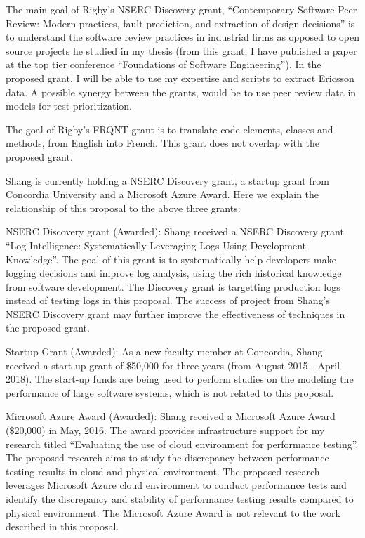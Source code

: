 \documentclass[12pt, letterpaper]{article}
\begin{document}
\fancyhead{}
\pagestyle{fancy}
\renewcommand{\headrulewidth}{0pt}

\begin{center}
\begin{LARGE}
\noindent
{}
\end{LARGE}
\end{center}


The main goal of Rigby's NSERC Discovery grant, “Contemporary Software Peer Review:
Modern practices, fault prediction, and extraction of design decisions” is to
understand the software review practices in industrial firms as opposed to open
source projects he studied in my thesis (from this grant, I have published a
paper at the top tier conference “Foundations of Software Engineering”). 
%
In the proposed grant, I will be able to use my expertise and scripts to
extract Ericsson data. A possible synergy between the grants, would be to use
peer review data in models for test prioritization. 

The goal of Rigby's FRQNT grant is to translate code elements, classes and methods,
from English into French. This grant does not overlap with the proposed grant.


Shang is currently holding a NSERC Discovery grant, a startup grant from Concordia University and a Microsoft Azure Award. Here we explain the relationship of this proposal to the above three grants:

NSERC Discovery grant (Awarded): Shang received a NSERC Discovery grant ``Log Intelligence: Systematically Leveraging Logs Using Development Knowledge''. The goal of this grant is to systematically help developers make logging decisions and improve log analysis, using the rich historical knowledge from software development. The Discovery grant is targetting production logs instead of testing logs in this proposal. The success of project from Shang's NSERC Discovery grant may further improve the effectiveness of techniques in the proposed grant.

Startup Grant (Awarded): As a new faculty member at Concordia, Shang received a start-up grant of \$50,000 for three years (from August 2015 - April 2018). The start-up funds are being used to perform studies on the modeling the performance of large software systems, which is not related to this proposal. 

Microsoft Azure Award (Awarded): Shang received a Microsoft Azure Award (\$20,000) in May, 2016. The award provides infrastructure support for my research titled ``Evaluating the use of cloud environment for performance testing''. The proposed research aims to study the discrepancy between performance testing results in cloud and physical environment. The proposed research leverages Microsoft Azure cloud environment to conduct performance tests and identify the discrepancy and stability of performance testing results compared to physical environment. The Microsoft Azure Award is not relevant to the work described in this proposal.
\end{document}
